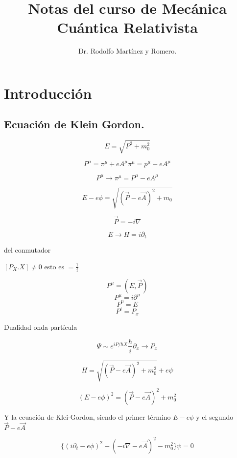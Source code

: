 \documentclass{report}
\begin{document}
\title{Notas del curso de Mec\'anica Cu\'antica Relativista}%

\author{Dr. Rodolfo Mart\'inez y Romero.}


\chapter{Introducci\'on}

\section{Ecuaci\'on de Klein Gordon. }

\[E = \sqrt{P^2 + m _{0}^2}\]

\[P^{\mu} = \pi ^{\mu} + e A^{\mu}   \pi^{\mu} = p ^{\mu} - e A^{\mu}\]

\[P^{\mu} \rightarrow \pi ^{\mu} = P^{\mu} - e A^{\mu}\]

\[E - e \phi = \sqrt{(\overrightarrow{P} -e \overrightarrow{A})^2 + m_0}\]

\[\overrightarrow{P} = -i \nabla\]

\[E \rightarrow H = i \partial_t\]

del conmutador

$[P_X.X] \neq 0$ esto es $= \frac{1}{i}$

\[P^{\mu} = (E, \overrightarrow{P})\]
\[P^{\mu} = i \partial ^{\mu}\]
\[P^{0} = E\]
\[P^{i} = P_{x}\]

Dualidad onda-partícula

\begin{equation}
\Psi \sim e^{i P/\hbar X}  \frac{\hbar}{i} \partial_{x} \rightarrow P_{x}
\end{equation}

\begin{equation}
H = \sqrt{(\overrightarrow{P}-e\overrightarrow{A})^2+m_{0}^2} + e\psi
\end{equation}

\begin{equation}
(E-e\phi)^2=(\overrightarrow{P}-e\overrightarrow{A})^2+m_{0}^2
\end{equation}

Y la ecuación de Klei-Gordon, siendo el primer término $E-e\phi$ y el segundo $\overrightarrow{P} -e\overrightarrow{A}$

\begin{equation}
\lbrace(i\partial_{t}-e\phi)^2 - (-i\nabla - e\overrightarrow{A})^2 - m_{0}^2\rbrace \psi = 0
\end{equation}
\end{document}
